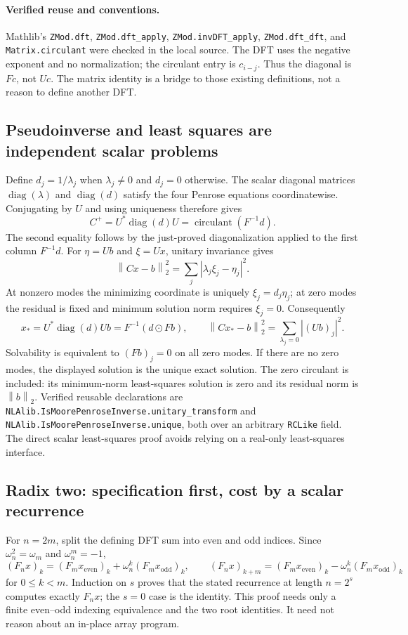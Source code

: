 \documentclass[11pt,a4paper]{article}
\newcommand{\norm}[1]{\left\lVert#1\right\rVert}
\DeclareMathOperator{\diag}{diag}
\DeclareRobustCommand{\code}[1]{{\footnotesize\urlstyle{tt}\nolinkurl{#1}}}
\begin{document}
\paragraph{Verified reuse and conventions.}
Mathlib's \code{ZMod.dft}, \code{ZMod.dft_apply},
\code{ZMod.invDFT_apply}, \code{ZMod.dft_dft}, and
\code{Matrix.circulant} were checked in the local source. The DFT uses
the negative exponent and no normalization; the circulant entry is
$c_{i-j}$. Thus the diagonal is $Fc$, not $Uc$. The matrix identity is a
bridge to those existing definitions, not a reason to define another DFT.

\subsection{Pseudoinverse and least squares are independent scalar problems}

Define $d_j=1/\lambda_j$ when $\lambda_j\ne0$ and $d_j=0$ otherwise.
The scalar diagonal matrices $\diag(\lambda)$ and $\diag(d)$ satisfy
the four Penrose equations coordinatewise. Conjugating by $U$ and using
uniqueness therefore gives
\[
 C^+=U^*\diag(d)U=\operatorname{circulant}(F^{-1}d).
\]
The second equality follows by the just-proved diagonalization applied
to the first column $F^{-1}d$. For $\eta=Ub$ and $\xi=Ux$, unitary
invariance gives
\[
 \norm{Cx-b}_2^2=\sum_j|\lambda_j\xi_j-\eta_j|^2.
\]
At nonzero modes the minimizing coordinate is uniquely
$\xi_j=d_j\eta_j$; at zero modes the residual is fixed and minimum
solution norm requires $\xi_j=0$. Consequently
\[
 x_*=U^*\diag(d)Ub=F^{-1}(d\odot Fb),\qquad
 \norm{Cx_*-b}_2^2=\sum_{\lambda_j=0}|(Ub)_j|^2.
\]
Solvability is equivalent to $(Fb)_j=0$ on all zero modes. If there are
no zero modes, the displayed solution is the unique exact solution.
The zero circulant is included: its minimum-norm least-squares solution
is zero and its residual norm is $\norm b_2$.
Verified reusable declarations are
\code{NLAlib.IsMoorePenroseInverse.unitary_transform} and
\code{NLAlib.IsMoorePenroseInverse.unique}, both over an arbitrary
\code{RCLike} field. The direct scalar least-squares proof avoids relying
on a real-only least-squares interface.

\subsection{Radix two: specification first, cost by a scalar recurrence}

For $n=2m$, split the defining DFT sum into even and odd indices. Since
$\omega_n^2=\omega_m$ and $\omega_n^m=-1$,
\[
 (F_nx)_k=(F_mx_{\mathrm{even}})_k
            +\omega_n^k(F_mx_{\mathrm{odd}})_k,
\qquad
 (F_nx)_{k+m}=(F_mx_{\mathrm{even}})_k
            -\omega_n^k(F_mx_{\mathrm{odd}})_k
\]
for $0\le k<m$. Induction on $s$ proves that the stated recurrence at
length $n=2^s$ computes exactly $F_nx$; the $s=0$ case is the identity.
This proof needs only a finite even--odd indexing equivalence and the two
root identities. It need not reason about an in-place array program.
\end{document}
